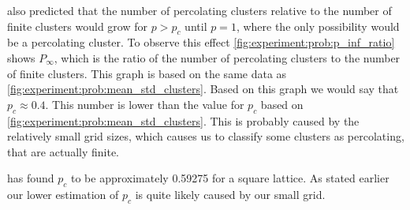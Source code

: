 \citeauthor{kenzel1997physics} also predicted that the number of percolating clusters relative to the number of finite clusters would grow for $p > p_c$ until $p = 1$, where the only possibility would be a percolating cluster. To observe this effect \cref{fig:experiment:prob:p_inf_ratio} shows $P_\infty$, which is the ratio of the number of percolating clusters to the number of finite clusters. This graph is based on the same data as \cref{fig:experiment:prob:mean_std_clusters}. Based on this graph we would say that $p_c \approx 0.4$. This number is lower than the value for $p_c$ based on \cref{fig:experiment:prob:mean_std_clusters}. This is probably caused by the relatively small grid sizes, which causes us to classify some clusters as percolating, that are actually finite. 

\textcite{stauffer1994introduction} has found $p_c$ to be approximately \num{0.59275} for a square lattice. As stated earlier our lower estimation of $p_c$ is quite likely caused by our small grid. 
